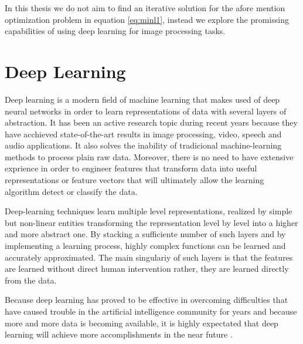 In this thesis we do not aim to find an iterative solution for the afore mention optimization problem in equation \ref{eq:minl1}, instead we explore the promissing capabilities of using deep learning for image processing tasks.

   
\section{Deep Learning}
Deep learning is a modern field of machine learning that makes used of deep neural networks in order to learn representations of data with several layers of abstraction. It has been an active research topic during recent years because they have acchieved state-of-the-art results in image processing, video, speech and audio applications. It also solves the inability of tradicional machine-learning methods to process plain raw data. Moreover, there is no need to have extensive exprience in order to engineer features that transform data into useful representations or feature vectors that will ultimately allow the learning algorithm detect or classify the data. \

Deep-learning techniques learn multiple level representations, realized by simple but non-linear entities transforming the representation level by level into a higher and more abstract one. By stacking a sufficiente number of such layers and by implementing a learning process, highly complex functions can be learned and accurately approximated. The main singulariy of such layers is that the features are learned without direct human intervention rather, they are learned directly from the data.   \   

Because deep learning has proved to be effective in overcoming difficulties that have caused trouble in the artificial intelligence community for years and because more and more data is becoming available, it is highly expectated that deep learning will achieve more accomplishments in the near future \cite{lecun2015deep}.          
